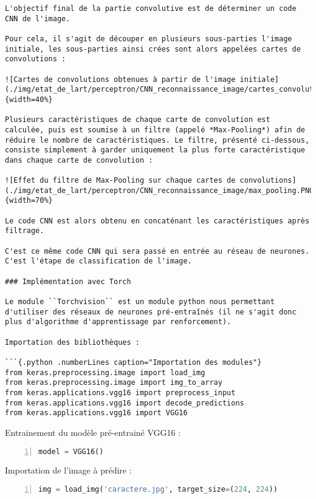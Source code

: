 \documentclass[
12pt,
french,
]{article}
\begin{document}
\begin{lstlisting}
L'objectif final de la partie convolutive est de déterminer un code CNN de l'image.

Pour cela, il s'agit de découper en plusieurs sous-parties l'image initiale, les sous-parties ainsi crées sont alors appelées cartes de convolutions :

![Cartes de convolutions obtenues à partir de l'image initiale](./img/etat_de_lart/perceptron/CNN_reconnaissance_image/cartes_convolutions.PNG){width=40%}

Plusieurs caractéristiques de chaque carte de convolution est calculée, puis est soumise à un filtre (appelé *Max-Pooling*) afin de réduire le nombre de caractéristiques. Le filtre, présenté ci-dessous, consiste simplement à garder uniquement la plus forte caractéristique dans chaque carte de convolution :

![Effet du filtre de Max-Pooling sur chaque cartes de convolutions](./img/etat_de_lart/perceptron/CNN_reconnaissance_image/max_pooling.PNG){width=70%}

Le code CNN est alors obtenu en concaténant les caractéristiques après filtrage.

C'est ce même code CNN qui sera passé en entrée au réseau de neurones. C'est l'étape de classification de l'image.

### Implémentation avec Torch

Le module ``Torchvision`` est un module python nous permettant d'utiliser des réseaux de neurones pré-entraînés (il ne s'agit donc plus d'algorithme d'apprentissage par renforcement).

Importation des bibliothèques :

```{.python .numberLines caption="Importation des modules"}
from keras.preprocessing.image import load_img
from keras.preprocessing.image import img_to_array
from keras.applications.vgg16 import preprocess_input
from keras.applications.vgg16 import decode_predictions
from keras.applications.vgg16 import VGG16
\end{lstlisting}

Entrainement du modèle pré-entrainé VGG16 :

\begin{lstlisting}[language=Python, numbers=left, caption={Entrainement du modele}]
model = VGG16()
\end{lstlisting}

Importation de l'image à prédire :

\begin{lstlisting}[language=Python, numbers=left, caption={Importation de l image}]
img = load_img('caractere.jpg', target_size=(224, 224))
\end{lstlisting}
\end{document}
